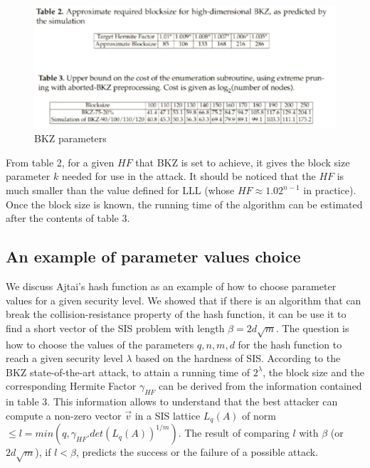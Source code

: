 \begin{figure}[h]
  \centering \includegraphics[scale=0.3]{bkzparams}
  \caption{BKZ parameters}
  \label{fig:BKZParams}
\end{figure}

From table 2, for a given $HF$ that BKZ is set to achieve, it gives the
block size parameter $k$ needed for use in the attack. It should be noticed that the $HF$ is much
smaller than the value defined for LLL (whose $HF \approx 1.02^{n-1}$ in
practice). Once the block size is known, the running time of the algorithm can be estimated after the contents of table 3.

\subsection{An example of parameter values choice}
\label{sec:parameterChoice}
We discuss Ajtai's hash function as an example of how to choose parameter values for
a given security level. We showed that if there is an algorithm that can break the
collision-resistance property of the hash function, it can be use it to find a
short vector of the SIS problem with length $\beta = 2d\sqrt{m}$. The question
is how to choose the values of the parameters $q,n,m,d$ for the hash function to reach a
given security level $\lambda$ based on the hardness of SIS. According to the
BKZ state-of-the-art attack, to attain a running time of $2^\lambda$, the block size and the corresponding Hermite Factor $\gamma_{HF}$ can be derived from the information contained in
table 3.
This information allows to understand that the best attacker can compute a non-zero vector $\vec{v}$ in a SIS
lattice $L_q(A)$ of norm $\leq l = min(q, \gamma_{HF}.det(L_q(A))^{1/m})$. 
The result of comparing $l$ with $\beta$ (or $2d\sqrt{m}$), if $l < \beta$, predicts the success or the failure of a possible attack.

